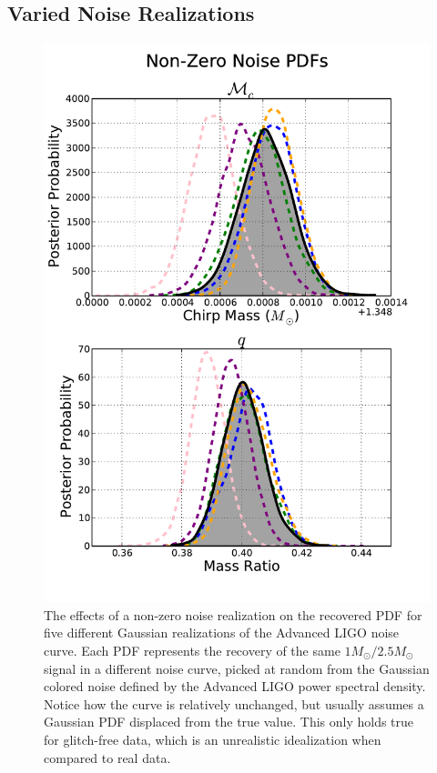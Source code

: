 \documentclass[11pt,a4paper]{emulateapj}
\begin{document}
\subsection{Varied Noise Realizations}
\label{noiseSection}

\begin{figure}[ht!]
  \centering
 \includegraphics[trim=0cm 0cm 0cm 0cm, clip=true,scale=0.52]{noisePDF.pdf}
 \caption{The effects of a non-zero noise realization on the recovered PDF for five different Gaussian realizations of the Advanced LIGO noise curve.  Each PDF represents the recovery of the same $1M_{\odot}/2.5M_{\odot}$ signal in a different noise curve, picked at random from the Gaussian colored noise defined by the Advanced LIGO power spectral density.  Notice how the curve is relatively unchanged, but usually assumes a Gaussian PDF displaced from the true value.  This only holds true for glitch-free data, which is an unrealistic idealization when compared to real data.}
 \label{noisePDFs}
\end{figure}
  
\end{document}

